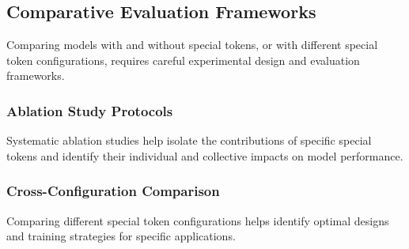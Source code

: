 \subsection{Comparative Evaluation Frameworks}

Comparing models with and without special tokens, or with different special token configurations, requires careful experimental design and evaluation frameworks.

\subsubsection{Ablation Study Protocols}

Systematic ablation studies help isolate the contributions of specific special tokens and identify their individual and collective impacts on model performance.

\subsubsection{Cross-Configuration Comparison}

Comparing different special token configurations helps identify optimal designs and training strategies for specific applications.